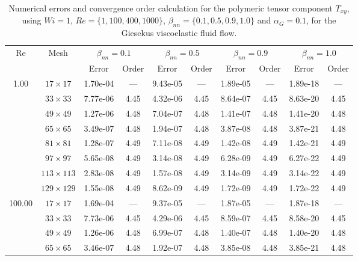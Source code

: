 \documentclass[preprint, 12pt]{elsarticle}
\begin{document}
\begin{center}
\begin{table}[H]
\caption{Numerical errors and convergence order calculation for the polymeric tensor component $T_{xy}$, using \mbox{$Wi=1$}, $Re=\{1,100,400,1000\}$, $\beta_{nn}=\{0.1,0.5,0.9,1.0\}$ and \mbox{$\alpha_G = 0.1$}, for the Giesekus viscoelastic fluid flow.\label{tab_GiesekusTxyalphaG01Resumida}}
\scriptsize{
    \begin{tabular*}{\textwidth}{@{\extracolsep\fill}cccccccccc@{}}
    \hline
    \multirow{2}{*}{$\operatorname{Re}$} & \multirow{2}{*}{Mesh} & \multicolumn{2}{c}{$\beta_{nn}=0.1$}  & \multicolumn{2}{c}{$\beta_{nn}=0.5$}  & \multicolumn{2}{c}{$\beta_{nn}=0.9$}  & \multicolumn{2}{c}{$\beta_{nn}=1.0$}\\ %
     & & Error & Order & Error & Order & Error & Order & Error & Order \\
    \hline
    \multirow{7}{*}{1.00} & $17\times 17$ & 1.70e-04 & --- & 9.43e-05 & --- & 1.89e-05 & --- & 1.89e-18 & --- \\
    & $33\times 33$ & 7.77e-06 & 4.45 & 4.32e-06 & 4.45 & 8.64e-07 & 4.45 & 8.63e-20 & 4.45 \\
    & $49\times 49$ & 1.27e-06 & 4.48 & 7.04e-07 & 4.48 & 1.41e-07 & 4.48 & 1.41e-20 & 4.48 \\
    & $65\times 65$ & 3.49e-07 & 4.48 & 1.94e-07 & 4.48 & 3.87e-08 & 4.48 & 3.87e-21 & 4.48 \\
    & $81\times 81$ & 1.28e-07 & 4.49 & 7.11e-08 & 4.49 & 1.42e-08 & 4.49 & 1.42e-21 & 4.49 \\
    & $97\times 97$ & 5.65e-08 & 4.49 & 3.14e-08 & 4.49 & 6.28e-09 & 4.49 & 6.27e-22 & 4.49 \\
    & $113\times 113$ & 2.83e-08 & 4.49 & 1.57e-08 & 4.49 & 3.14e-09 & 4.49 & 3.14e-22 & 4.49 \\
    & $129\times 129$ & 1.55e-08 & 4.49 & 8.62e-09 & 4.49 & 1.72e-09 & 4.49 & 1.72e-22 & 4.49 \\
    \hline\hline
    \multirow{7}{*}{100.00} & $17\times 17$ & 1.69e-04 & --- & 9.37e-05 & --- & 1.87e-05 & --- & 1.87e-18 & --- \\
    & $33\times 33$ & 7.73e-06 & 4.45 & 4.29e-06 & 4.45 & 8.59e-07 & 4.45 & 8.58e-20 & 4.45 \\
    & $49\times 49$ & 1.26e-06 & 4.48 & 6.99e-07 & 4.48 & 1.40e-07 & 4.48 & 1.40e-20 & 4.48 \\
    & $65\times 65$ & 3.46e-07 & 4.48 & 1.92e-07 & 4.48 & 3.85e-08 & 4.48 & 3.85e-21 & 4.48 \\

\end{tabular*}}
\end{table}
\end{center}
\end{document}
